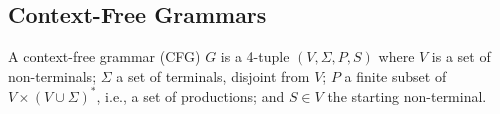 \documentclass[acmsmall,review,anonymous]{acmart}\settopmatter{printfolios=true,printccs=false,printacmref=false}
\newcommand{\support}{\mathit{Supp}}
\newcommand{\NT}{V} %
\newcommand{\T}{\Sigma} %
\newcommand{\regex}{\mathit{Reg}}
\begin{document}








\subsection{Context-Free Grammars} \label{sec:preliminaries-cfgs}

A context-free grammar (CFG) $G$ is a 4-tuple $(\NT, \T, P, S)$ where $\NT$ is a set of non-terminals; $\T$ a set of terminals, disjoint from $\NT$; $P$ a finite subset of $\NT \times (\NT \cup \T)^{*}$, i.e., a set of productions; and $S \in \NT$ the starting non-terminal.
\end{document}
